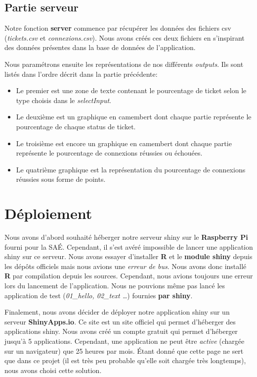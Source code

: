 \documentclass[12pt, a4paper]{article}
\begin{document}
\subsection*{Partie serveur}

Notre fonction \textbf{server} commence par récupérer les données des fichiers csv (\textit{tickets.csv} et \textit{connexions.csv}).
Nous avons créés ces deux fichiers en s'inspirant des données présentes dans la base de données de l'application.

\noindent Nous paramétrons ensuite les représentations de nos différents \textit{outputs}.
Ils sont listés dans l'ordre décrit dans la partie précédente:

\begin{itemize}
    \item Le premier est une zone de texte contenant le pourcentage de ticket selon le type choisis dans le \textit{selectInput}.
    \item Le deuxième est un graphique en camembert dont chaque partie représente le pourcentage de chaque status de ticket.
    \item Le troisième est encore un graphique en camembert dont chaque partie représente le pourcentage de connexions réussies ou échouées.
    \item Le quatrième graphique est la représentation du pourcentage de connexions réussies sous forme de points.
\end{itemize}

\section{Déploiement}

Nous avons d'abord souhaité héberger notre serveur shiny sur le \textbf{Raspberry Pi} fourni pour la SAÉ.
Cependant, il s'est avéré impossible de lancer une application shiny sur ce serveur.
Nous avons essayer d'installer \textbf{R} et le \textbf{module shiny} depuis les dépôts officiels mais nous avions une \textit{erreur de bus}.
Nous avons donc installé \textbf{R} par compilation depuis les sources.
Cependant, nous avions toujours une erreur lors du lancement de l'application.
Nous ne pouvions même pas lancé les application de test (\textit{01\_hello, 02\_text \ldots}) fournies \textbf{par shiny}.
\bigskip

Finalement, nous avons décider de déployer notre application shiny sur un serveur \textbf{ShinyApps.io}.
Ce site est un site officiel qui permet d'héberger des applications shiny.
Nous avons créé un compte gratuit qui permet d'héberger jusqu'à 5 applications.
Cependant, une application ne peut être \textit{active} (chargée sur un navigateur) que 25 heures par mois.
Étant donné que cette page ne sert que dans ce projet (il est très peu probable qu'elle soit chargée très longtemps),
nous avons choisi cette solution.
\bigskip
\end{document}
